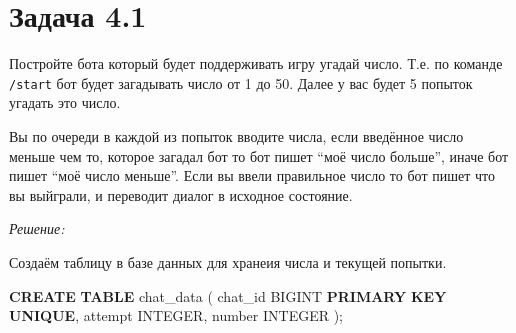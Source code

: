 \documentclass[
]{book}
\newenvironment{Shaded}{\begin{snugshade}}{\end{snugshade}}
\newcommand{\CommentTok}[1]{\textcolor[rgb]{0.56,0.35,0.01}{\textit{#1}}}
\newcommand{\DataTypeTok}[1]{\textcolor[rgb]{0.13,0.29,0.53}{#1}}
\newcommand{\FunctionTok}[1]{\textcolor[rgb]{0.13,0.29,0.53}{\textbf{#1}}}
\newcommand{\KeywordTok}[1]{\textcolor[rgb]{0.13,0.29,0.53}{\textbf{#1}}}
\newcommand{\NormalTok}[1]{#1}
\newcommand{\OtherTok}[1]{\textcolor[rgb]{0.56,0.35,0.01}{#1}}
\newcommand{\SpecialCharTok}[1]{\textcolor[rgb]{0.81,0.36,0.00}{\textbf{#1}}}
\newcommand{\StringTok}[1]{\textcolor[rgb]{0.31,0.60,0.02}{#1}}
\begin{document}
\begin{Shaded}
\end{Shaded}

\section*{Задача 4.1}\label{ux437ux430ux434ux430ux447ux430-4.1}

Постройте бота который будет поддерживать игру угадай число. Т.е. по команде \texttt{/start} бот будет загадывать число от 1 до 50. Далее у вас будет 5 попыток угадать это число.

Вы по очереди в каждой из попыток вводите числа, если введённое число меньше чем то, которое загадал бот то бот пишет ``моё число больше'', иначе бот пишет ``моё число меньше''. Если вы ввели правильное число то бот пишет что вы выйграли, и переводит диалог в исходное состояние.

\emph{Решение:}

Создаём таблицу в базе данных для хранеия числа и текущей попытки.

\begin{Shaded}
\begin{Highlighting}[]
\KeywordTok{CREATE} \KeywordTok{TABLE}\NormalTok{ chat\_data (}
\NormalTok{    chat\_id BIGINT  }\KeywordTok{PRIMARY} \KeywordTok{KEY}
                    \KeywordTok{UNIQUE}\NormalTok{,}
\NormalTok{    attempt    }\DataTypeTok{INTEGER}\NormalTok{,}
    \DataTypeTok{number}     \DataTypeTok{INTEGER}
\NormalTok{);}
\end{Highlighting}
\end{Shaded}
\end{document}
